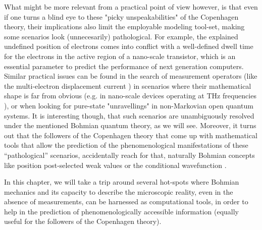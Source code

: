 \documentclass[11pt, a4paper]{article} %
\begin{document}
What might be more relevant from a practical point of view however, is that even if one turns a blind eye to these "picky unspeakabilities" of the Copenhagen theory, their implications also limit the employable modeling tool-set, making some scenarios look (unnecesarily) pathological. For example, the explained undefined position of electrons comes into conflict with a well-defined dwell time for the electrons in the active region of a nano-scale transistor, which is an essential parameter to predict the performance of next generation computers. Similar practical issues can be found in the search of measurement operators (like the multi-electron displacement current \cite{equiv, Pel}) in scenarios where their mathematical shape is far from obvious (e.g. in nano-scale devices operating at THz frequencies \cite{Thz}), or when looking for pure-state "unravellings" in non-Markovian open quantum systems. It is interesting though, that such scenarios are unambiguously resolved under the mentioned Bohmian quantum theory, as we will see. Moreover, it turns out that the followers of the Copenhagen theory that come up with mathematical tools that allow the prediction of the phenomenological manifestations of these “pathological” scenarios, accidentally reach for that, naturally Bohmian concepts like position post-selected weak values or the conditional wavefunction \cite{interpretSSE,NMisModal}.\vspace{-0.1cm}

In this chapter, we will take a trip around several hot-spots where Bohmian mechanics and its capacity to describe the microscopic reality, even in the absence of measurements, can be harnessed as computational tools, in order to help in the prediction of phenomenologically accessible information (equally useful for the followers of the Copenhagen theory). 
\end{document}
